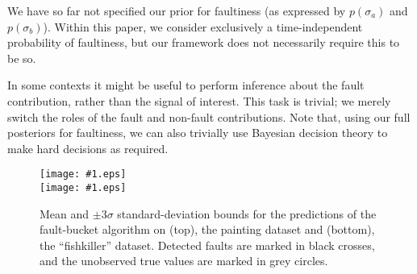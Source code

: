 \documentclass{article} %
\newcommand{\psff}[1]{\texttt{[image: \#1.eps]}}
\begin{document}
We have so far not specified our prior for faultiness (as expressed by
$p(\sigma_a)$ and $p(\sigma_b)$). Within this paper, we consider
exclusively a time-independent probability of faultiness, but our framework does not necessarily require this to be so.

In some contexts it might be useful to perform inference about the
fault contribution, rather than the signal of interest.  This task is
trivial; we merely switch the roles of the fault and non-fault
contributions. Note that, using our full posteriors for faultiness, we
can also trivially use Bayesian decision theory to make hard decisions
as required.


\begin{figure*}
  \centering
  \small
  \psff{painting} \\
  \psff{fishkiller}
  \caption{Mean and $\pm3\sigma$ standard-deviation bounds for the
    predictions of the fault-bucket algorithm on (top), the painting
    dataset and (bottom), the ``fishkiller'' dataset.  Detected faults are
    marked in black crosses, and the unobserved true values are marked
    in grey circles.}
  \label{justfb}
\end{figure*}

\end{document}
